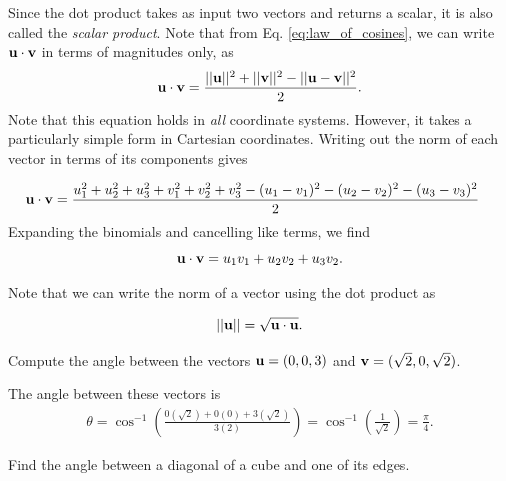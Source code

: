 \documentclass[12pt,letterpaper,reqno]{article}
\numberwithin{equation}{section}
\newcommand{\ti}[1]{\textit{#1}}
\begin{document}
Since the dot product takes as input two vectors and returns a scalar, it is also called the \ti{scalar product}. Note that from Eq. \eqref{eq:law_of_cosines}, we can write ${\bf u}\cdot {\bf v}$ in terms of magnitudes only, as 
\begin{equation}\label{eq:dot_product_magnitudes}
	{\bf u}\cdot {\bf v}=\frac{||{\bf u}||^2+||{\bf v}||^2-||{\bf u}-{\bf v}||^2}{2}.
\end{equation}
Note that this equation holds in \ti{all} coordinate systems. However, it takes a particularly simple form in Cartesian coordinates. Writing out the norm of each vector in terms of its components gives

\begin{align*}
	{\bf u}\cdot {\bf v}&=\frac{u_1^2+u_2^2+u_3^2+v_1^2+v_2^2+v_3^2-(u_1-v_1)^2-(u_2-v_2)^2-(u_3-v_3)^2}{2}
\end{align*}
Expanding the binomials and cancelling like terms, we find
\begin{equation}
	{\bf u}\cdot {\bf v}=u_1v_1+u_2v_2+u_3v_2.
\end{equation}

Note that we can write the norm of a vector using the dot product as 

\begin{equation}\label{eq:dot_product_norm}
	||{\bf u}||=\sqrt{{\bf u}\cdot {\bf u}}.
\end{equation}

\begin{exercise}
Compute the angle between the vectors ${\bf u}=(0,0,3)$ and ${\bf v}=(\sqrt{2},0,\sqrt{2})$.	
\end{exercise}

{\color{red}  The angle between these vectors is
\begin{align*}
	\theta=\cos^{-1}\left(\frac{0(\sqrt{2})+0(0)+3(\sqrt{2})}{3(2)}\right)=\cos^{-1}\left(\frac{1}{\sqrt{2}}\right)=\frac{\pi}{4}.
\end{align*}}

\begin{exercise}
	Find the angle between a diagonal of a cube and one of its edges.
\end{exercise}
\end{document}
